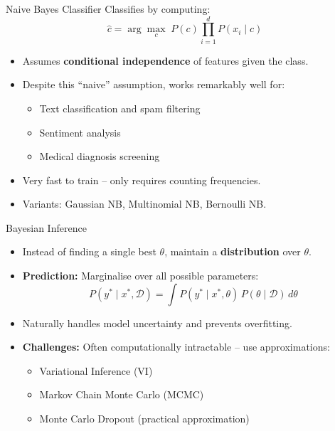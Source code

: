 \begin{frame}{Naive Bayes Classifier}
Classifies by computing:
\[
\hat{c} = \arg\max_{c}\; P(c) \prod_{i=1}^{d} P(x_i \mid c)
\]
\begin{itemize}
    \item Assumes \textbf{conditional independence} of features given the class.
    \item Despite this ``naive'' assumption, works remarkably well for:
    \begin{itemize}
        \item Text classification and spam filtering
        \item Sentiment analysis
        \item Medical diagnosis screening
    \end{itemize}
    \item Very fast to train -- only requires counting frequencies.
    \item Variants: Gaussian NB, Multinomial NB, Bernoulli NB.
\end{itemize}
\end{frame}

\begin{frame}{Bayesian Inference}
\begin{itemize}
    \item Instead of finding a single best $\theta$, maintain a \textbf{distribution} over $\theta$.
    \item \textbf{Prediction:} Marginalise over all possible parameters:
    \[
        P(y^* \mid x^*, \mathcal{D}) = \int P(y^* \mid x^*, \theta)\, P(\theta \mid \mathcal{D})\, d\theta
    \]
    \item Naturally handles model uncertainty and prevents overfitting.
    \item \textbf{Challenges:} Often computationally intractable -- use approximations:
    \begin{itemize}
        \item Variational Inference (VI)
        \item Markov Chain Monte Carlo (MCMC)
        \item Monte Carlo Dropout (practical approximation)
    \end{itemize}
\end{itemize}
\end{frame}

